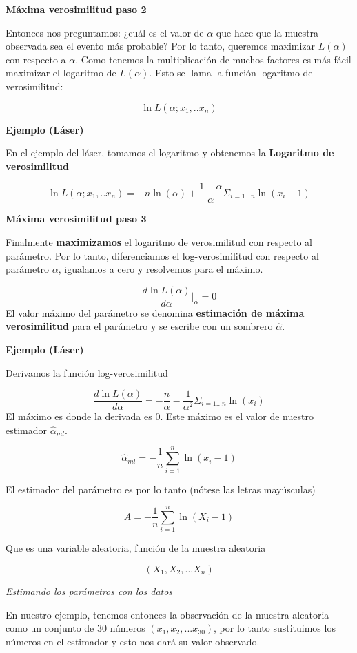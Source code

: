 \documentclass[
]{book}
\begin{document}
\textbf{Máxima verosimilitud paso 2}

Entonces nos preguntamos: ¿cuál es el valor de \(\alpha\) que hace que la muestra observada sea el evento más probable? Por lo tanto, queremos maximizar \(L(\alpha)\) con respecto a \(\alpha\). Como tenemos la multiplicación de muchos factores es más fácil maximizar el logaritmo de \(L(\alpha)\). Esto se llama la función logaritmo de verosimilitud:

\[\ln L(\alpha;x_1,..x_n)\]

\textbf{Ejemplo (Láser)}

En el ejemplo del láser, tomamos el logaritmo y obtenemos la \textbf{Logaritmo de verosimilitud}

\[\ln L(\alpha;x_1,..x_n)= -n \ln(\alpha) + {\frac{1-\alpha}{\alpha}} \Sigma_{i=1...n} \ln (x_i-1)\]

\textbf{Máxima verosimilitud paso 3}

Finalmente \textbf{maximizamos} el logaritmo de verosimilitud con respecto al parámetro. Por lo tanto, diferenciamos el log-verosimilitud con respecto al parámetro \(\alpha\), igualamos a cero y resolvemos para el máximo.

\[\frac{d \ln L(\alpha)}{d \alpha} \big|_{\hat{\alpha}}=0 \]
El valor máximo del parámetro se denomina \textbf{estimación de máxima verosimilitud} para el parámetro y se escribe con un sombrero \(\hat{\alpha}\).

\textbf{Ejemplo (Láser)}

Derivamos la función log-verosimilitud

\[\frac{d \ln L(\alpha)}{d \alpha}= -\frac{n}{\alpha} - \frac{1}{\alpha^2} \Sigma_{i=1.. .n} \ln (x_i)\]
El máximo es donde la derivada es \(0\). Este máximo es el valor de nuestro estimador \(\hat{\alpha}_{ml}\).

\[\hat{\alpha}_{ml}=-\frac{1}{n}\sum_{i=1}^n \ln (x_i-1)\]

El estimador del parámetro es por lo tanto (nótese las letras mayúsculas)

\[A=-\frac{1}{n}\sum_{i=1}^n \ln (X_i-1)\]

Que es una variable aleatoria, función de la muestra aleatoria

\[(X_1, X_2, ... X_n)\]

\emph{Estimando los parámetros con los datos}

En nuestro ejemplo, tenemos entonces la observación de la muestra aleatoria como un conjunto de 30 números \((x_1, x_2, ...x_{30})\), por lo tanto sustituimos los números en el estimador y esto nos dará su valor observado.
\end{document}
